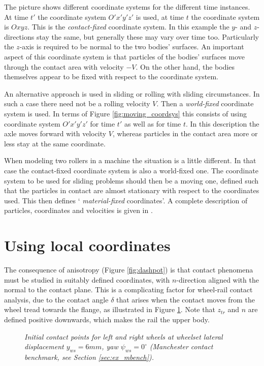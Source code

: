 \documentclass[12pt]{report}
\begin{document}
The picture shows different coordinate systems for the different time
instances. At time $t'$ the coordinate system $O'x'y'z'$ is used, at time $t$
the coordinate system is $Oxyz$. This is the {\em contact-fixed\/}
coordinate system. In this example the $y$- and $z$-directions stay the same,
but generally these may vary over time too. Particularly the $z$-axis is
required to be normal to the two bodies' surfaces. An important aspect of
this coordinate system is that particles of the bodies' surfaces move
through the contact area with velocity $-V$. On the other hand, the
bodies themselves appear to be fixed with respect to the coordinate system.

An alternative approach is used in sliding or rolling with sliding
circumstances. In such a case there need not be a rolling velocity $V$.
Then a {\em world-fixed\/} coordinate system is used. In terms of Figure
\ref{fig:moving_coordsys} this consists of using coordinate system $O'x'y'z'$
for time $t'$ as well as for time $t$. In this description the axle moves
forward with velocity $V$, whereas particles in the contact area more or
less stay at the same coordinate.

When modeling two rollers in a machine the situation is a little different.
In that case the contact-fixed coordinate system is also a world-fixed one.
The coordinate system to be used for sliding problems should then be a
moving one, defined such that the particles in contact are almost
stationary with respect to the coordinates used. This then defines `{\em
material-fixed\/} coordinates'.  A complete description of particles,
coordinates and velocities is given in \cite{Kalker1990}.

\section{Using local coordinates}

The consequence of anisotropy (Figure \ref{fig:dashpot}) is that contact
phenomena must be studied in suitably defined coordinates, with
$n$-direction aligned with the normal to the contact plane. This is a
complicating factor for wheel-rail contact analysis, due to the contact
angle $\delta$ that arises when the contact moves from the wheel tread
towards the flange, as illustrated in Figure \ref{fig:s1002_init_cp_6mm}.
Note that $z_{tr}$ and $n$ are defined positive downwards, which makes the
rail the upper body.

\begin{figure}[bt]
\centering
{}
\caption{\em Initial contact points for left and right wheels at wheelset
lateral displacement $y_{ws}=6\unit{mm}$, yaw $\psi_{ws}=0^\circ$ (Manchester
contact benchmark, see Section \ref{sec:ex_mbench}).}
\label{fig:s1002_init_cp_6mm}
\end{figure}
\end{document}
